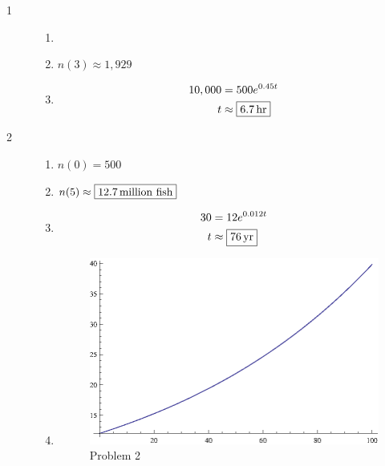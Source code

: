 \documentclass{exam}
\begin{document}
    \begin{description}

      \item[1]
        \begin{enumerate}[a]
          \item {}

          \item $n(3) \approx \boxed{1,929}$

          \item
            \begin{align*}
              10,000 & = 500 e^{0.45t} \\
              t      & \approx \boxed{\unit[6.7]{hr}} \\
            \end{align*}

        \end{enumerate}

      \item[2]
        \begin{enumerate}[a]
          \item $n(0) = \boxed{500}$

          \item $n(5) \approx \boxed{ \unit[12.7]{million\ fish}} $

          \item
            \begin{align*}
              30 & = 12 e^{0.012t} \\
              t      & \approx \boxed{\unit[76]{yr}} \\
            \end{align*}

          \item
            \begin{figure}[H]
              \centering
              \includegraphics{problem2.eps}
              \caption{Problem 2}
            \end{figure}
        \end{enumerate}


\end{description}
\end{document}
